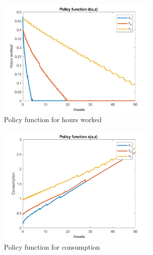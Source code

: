 \documentclass[12pt]{article}
\begin{document}


\begin{figure}[!htbp]
	\centering
	\includegraphics[width=0.7\textwidth]{pol_hours.png}
	\caption{Policy function for hours worked}
	\label{fig:pol_hours}
\end{figure}

\begin{figure}[!htbp]
	\centering
	\includegraphics[width=0.7\textwidth]{pol_cons.png}
	\caption{Policy function for consumption}
	\label{fig:pol_cons}
\end{figure}
		
	
\end{document}
